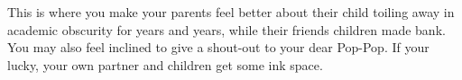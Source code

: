 This is where you make your parents feel better about their child toiling away in academic obscurity for years and years, while their friends children made bank. You may also feel inclined to give a shout-out to your dear Pop-Pop. If your lucky, your own partner and children get some ink space. 
